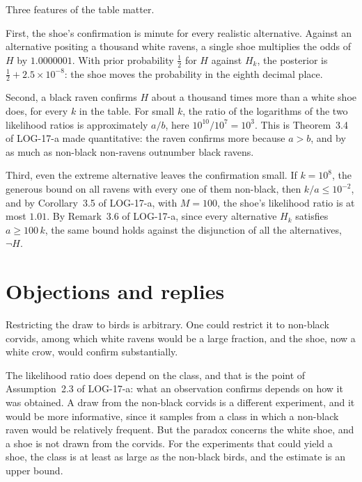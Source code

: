 \documentclass{situationist-preprint}
\begin{document}
Three features of the table matter.

First, the shoe's confirmation is minute for every realistic alternative. Against an alternative positing a thousand white ravens, a single shoe multiplies the odds of $H$ by $1.0000001$. With prior probability $\frac12$ for $H$ against $H_k$, the posterior is $\frac12 + 2.5 \times 10^{-8}$: the shoe moves the probability in the eighth decimal place.

Second, a black raven confirms $H$ about a thousand times more than a white shoe does, for every $k$ in the table. For small $k$, the ratio of the logarithms of the two likelihood ratios is approximately $a/b$, here $10^{10}/10^7 = 10^3$. This is Theorem~3.4 of LOG-17-a made quantitative: the raven confirms more because $a > b$, and by as much as non-black non-ravens outnumber black ravens.

Third, even the extreme alternative leaves the confirmation small. If $k = 10^8$, the generous bound on all ravens with every one of them non-black, then $k/a \leq 10^{-2}$, and by Corollary~3.5 of LOG-17-a, with $M = 100$, the shoe's likelihood ratio is at most $1.01$. By Remark~3.6 of LOG-17-a, since every alternative $H_k$ satisfies $a \geq 100\,k$, the same bound holds against the disjunction of all the alternatives, $\neg H$.

\section{Objections and replies}

\begin{objection}
Restricting the draw to birds is arbitrary. One could restrict it to non-black corvids, among which white ravens would be a large fraction, and the shoe, now a white crow, would confirm substantially.
\end{objection}

\begin{reply}
The likelihood ratio does depend on the class, and that is the point of Assumption~2.3 of LOG-17-a: what an observation confirms depends on how it was obtained. A draw from the non-black corvids is a different experiment, and it would be more informative, since it samples from a class in which a non-black raven would be relatively frequent. But the paradox concerns the white shoe, and a shoe is not drawn from the corvids. For the experiments that could yield a shoe, the class is at least as large as the non-black birds, and the estimate is an upper bound.
\end{reply}
\end{document}
